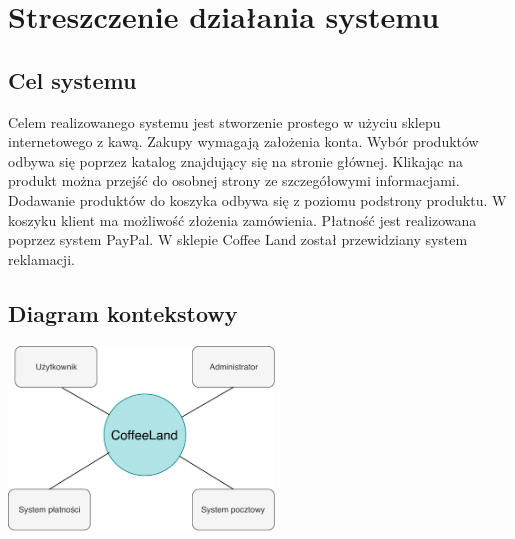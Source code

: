 \documentclass[10pt]{report}
\begin{document}
	
	
	 
	
	\tableofcontents
	
	\setcounter{chapter}{0}	
	\setcounter{section}{0}	
	
	
	
	\chapter{Streszczenie działania systemu}
	
		\section{Cel systemu}
	
		Celem realizowanego systemu jest stworzenie prostego w użyciu sklepu internetowego z kawą. Zakupy wymagają założenia konta. Wybór produktów odbywa się poprzez katalog znajdujący się na stronie głównej. Klikając na produkt można przejść do osobnej strony ze szczegółowymi informacjami. Dodawanie produktów do koszyka odbywa się z poziomu podstrony produktu. W koszyku klient ma możliwość złożenia zamówienia. Płatność jest realizowana poprzez system PayPal. W sklepie Coffee Land został przewidziany system reklamacji.
	
		\section{Diagram kontekstowy}
			\begin{center}
				\includegraphics[width=200pt]{kontekstowy.pdf}
			\end{center}
	
\end{document}
